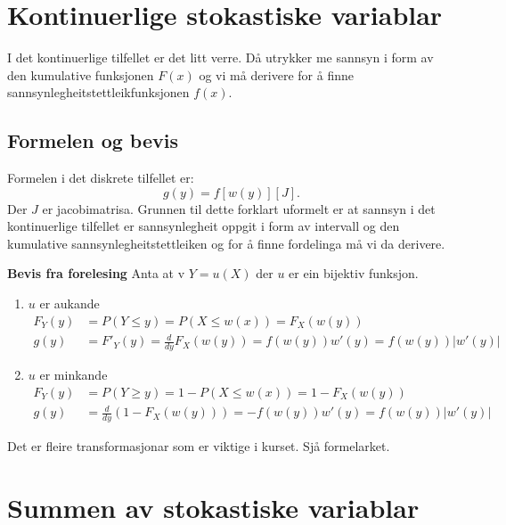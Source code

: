 \section{Kontinuerlige stokastiske variablar}
I det kontinuerlige tilfellet er det litt verre. Då utrykker me sannsyn i form av den kumulative funksjonen $F(x)$ og vi må derivere for å finne sannsynlegheitstettleikfunksjonen $f(x)$.

\subsection{Formelen og bevis}
Formelen i det diskrete tilfellet er:
\begin{equation}
    g(y) = f[w(y)][J].
\end{equation}
Der $J$ er jacobimatrisa. Grunnen til dette forklart uformelt er at sannsyn i det kontinuerlige tilfellet er sannsynlegheit oppgit i form av intervall og den kumulative sannsynlegheitstettleiken og for å finne fordelinga må vi da derivere. 

\textbf{Bevis fra forelesing}
Anta at v $Y = u(X)$ der $u$ er ein bijektiv funksjon.

\begin{enumerate}
    \item  $u$ er aukande
        \begin{equation}
            \begin{split}
                F_Y(y) & = P(Y \leq y) = P(X \leq w(x)) = F_X(w(y)) \\
                g(y) & = F'_Y(y) = \frac{d}{dy}F_X(w(y)) = f(w(y))w'(y) = f(w(y))|w'(y)|
            \end{split}
        \end{equation}
    \item  $u$ er minkande
        \begin{equation}
            \begin{split}
                F_Y(y) & = P(Y \geq y) = 1 - P(X \leq w(x)) = 1 - F_X(w(y)) \\
                g(y) & = \frac{d}{dy}(1 - F_X(w(y))) = -f(w(y))w'(y) =  f(w(y))|w'(y)|
            \end{split}
        \end{equation}
\end{enumerate}

Det er fleire transformasjonar som er viktige i kurset. Sjå formelarket.

\section{Summen av stokastiske variablar}


